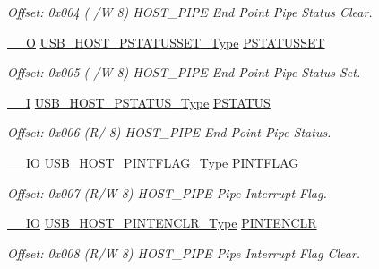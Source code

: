 \begin{DoxyCompactItemize}
\begin{DoxyCompactList}\small\item\em Offset\+: 0x004 ( /W 8) H\+O\+S\+T\+\_\+\+P\+I\+PE End Point Pipe Status Clear. \end{DoxyCompactList}\item 
\mbox{\hyperlink{core__cm0plus_8h_a7e25d9380f9ef903923964322e71f2f6}{\+\_\+\+\_\+O}} \mbox{\hyperlink{union_u_s_b___h_o_s_t___p_s_t_a_t_u_s_s_e_t___type}{U\+S\+B\+\_\+\+H\+O\+S\+T\+\_\+\+P\+S\+T\+A\+T\+U\+S\+S\+E\+T\+\_\+\+Type}} \mbox{\hyperlink{struct_usb_host_pipe_a9763934dd6581bc0e02ab231daf490a8}{P\+S\+T\+A\+T\+U\+S\+S\+ET}}
\begin{DoxyCompactList}\small\item\em Offset\+: 0x005 ( /W 8) H\+O\+S\+T\+\_\+\+P\+I\+PE End Point Pipe Status Set. \end{DoxyCompactList}\item 
\mbox{\hyperlink{core__cm0plus_8h_af63697ed9952cc71e1225efe205f6cd3}{\+\_\+\+\_\+I}} \mbox{\hyperlink{union_u_s_b___h_o_s_t___p_s_t_a_t_u_s___type}{U\+S\+B\+\_\+\+H\+O\+S\+T\+\_\+\+P\+S\+T\+A\+T\+U\+S\+\_\+\+Type}} \mbox{\hyperlink{struct_usb_host_pipe_adc9985facd8dc67ac81e06b89b407fed}{P\+S\+T\+A\+T\+US}}
\begin{DoxyCompactList}\small\item\em Offset\+: 0x006 (R/ 8) H\+O\+S\+T\+\_\+\+P\+I\+PE End Point Pipe Status. \end{DoxyCompactList}\item 
\mbox{\hyperlink{core__cm0plus_8h_aec43007d9998a0a0e01faede4133d6be}{\+\_\+\+\_\+\+IO}} \mbox{\hyperlink{union_u_s_b___h_o_s_t___p_i_n_t_f_l_a_g___type}{U\+S\+B\+\_\+\+H\+O\+S\+T\+\_\+\+P\+I\+N\+T\+F\+L\+A\+G\+\_\+\+Type}} \mbox{\hyperlink{struct_usb_host_pipe_a4309a937eee9a19e77c9e54705efc353}{P\+I\+N\+T\+F\+L\+AG}}
\begin{DoxyCompactList}\small\item\em Offset\+: 0x007 (R/W 8) H\+O\+S\+T\+\_\+\+P\+I\+PE Pipe Interrupt Flag. \end{DoxyCompactList}\item 
\mbox{\hyperlink{core__cm0plus_8h_aec43007d9998a0a0e01faede4133d6be}{\+\_\+\+\_\+\+IO}} \mbox{\hyperlink{union_u_s_b___h_o_s_t___p_i_n_t_e_n_c_l_r___type}{U\+S\+B\+\_\+\+H\+O\+S\+T\+\_\+\+P\+I\+N\+T\+E\+N\+C\+L\+R\+\_\+\+Type}} \mbox{\hyperlink{struct_usb_host_pipe_adb035ad58ef836aa4a915d83a5cfec73}{P\+I\+N\+T\+E\+N\+C\+LR}}
\begin{DoxyCompactList}\small\item\em Offset\+: 0x008 (R/W 8) H\+O\+S\+T\+\_\+\+P\+I\+PE Pipe Interrupt Flag Clear. \end{DoxyCompactList}\item 

\end{DoxyCompactItemize}
